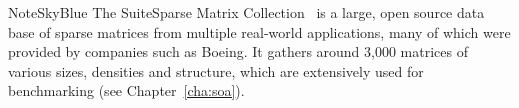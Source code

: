 \begin{highlight}{Note}{SkyBlue}
    The SuiteSparse Matrix Collection~\cite{Kolodziej2019_SuiteSparse} is a large, open source data base of sparse matrices from multiple real-world applications, many of which were provided by companies such as Boeing.
    It gathers around 3,000 matrices of various sizes, densities and structure, which are extensively used for benchmarking (see Chapter~\ref{cha:soa}).
\end{highlight}